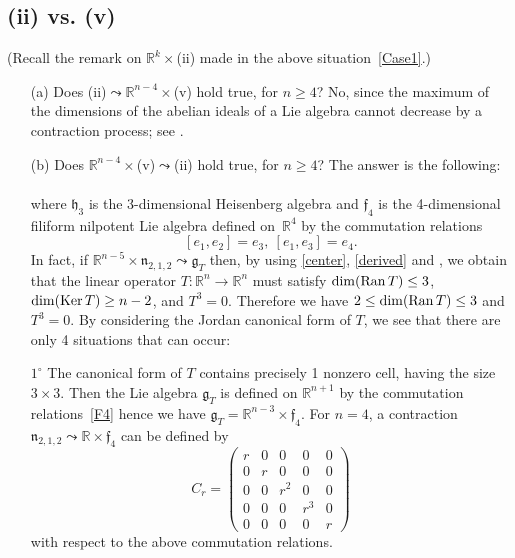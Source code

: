 \documentclass[
reqno]{amsart}
\begin{document}
\subsection{(ii) vs. (v)}\label{Case8}
(Recall the remark on ${{\mathbb R}}^k\times$(ii) made in the above situation~\ref{Case1}.)
\begin{itemize}
\item[(a)] Does (ii)${\leadsto}$${{\mathbb R}}^{n-4}\times$(v) hold true, for $n\ge 4$?   
No, since the maximum of the dimensions of the abelian ideals of a Lie algebra  
cannot decrease by a contraction process; see \cite[Th. 1(8)]{NP06}. 
\item[(b)] Does ${{\mathbb R}}^{n-4}\times$(v)${\leadsto}$(ii) hold true, for $n\ge 4$? 
The answer is the following: 
\\  
\\ where ${{\mathfrak h}}_3$ is the 3-dimensional Heisenberg algebra and 
${{\mathfrak f}}_4$ is the 4-dimen\-sional filiform nilpotent Lie algebra 
defined on~${{\mathbb R}}^4$ by the commutation relations 
\begin{equation}\label{F4}
[e_1,e_2]=e_3,\ [e_1,e_3]=e_4.
\end{equation}
In fact, if ${{\mathbb R}}^{n-5}\times{{\mathfrak n}}_{2,1,2} {\leadsto}{{\mathfrak g}}_T$ then, 
by using \eqref{center}, \eqref{derived} and \cite[Th.1((3)--(4),(14))]{NP06}, 
we obtain that the linear operator $T\colon{{\mathbb R}}^n\to{{\mathbb R}}^n$ must 
satisfy $\dim({{\rm Ran}\,} T)\le 3$, $\dim({{\rm Ker}\,} T)\ge n-2$, and $T^3=0$. 
Therefore we have $2\le\dim({{\rm Ran}\,} T)\le 3$ and $T^3=0$. 
By considering the Jordan canonical form of $T$, 
we see that there are only 4 situations that can occur: 

$1^\circ$ The canonical form of $T$ contains precisely 1 nonzero cell, 
having the size $3\times 3$. 
Then the Lie algebra ${{\mathfrak g}}_T$ is defined on ${{\mathbb R}}^{n+1}$ by the commutation relations~\eqref{F4}
hence we have ${{\mathfrak g}}_T={{\mathbb R}}^{n-3}\times{{\mathfrak f}}_4$. 
For $n=4$, a contraction ${{\mathfrak n}}_{2,1,2} {\leadsto} {{\mathbb R}}\times{{\mathfrak f}}_4$ 
can be defined by 
$$C_r=\begin{pmatrix}
r & 0 & 0   & 0   & 0  \\
0 & r & 0   & 0   & 0  \\
0 & 0 & r^2 & 0   & 0  \\
0 & 0 & 0   & r^3 & 0  \\
0 & 0 & 0   & 0   & r  
\end{pmatrix}$$
with respect to the above commutation relations. 
 


\end{itemize}
\end{document}
